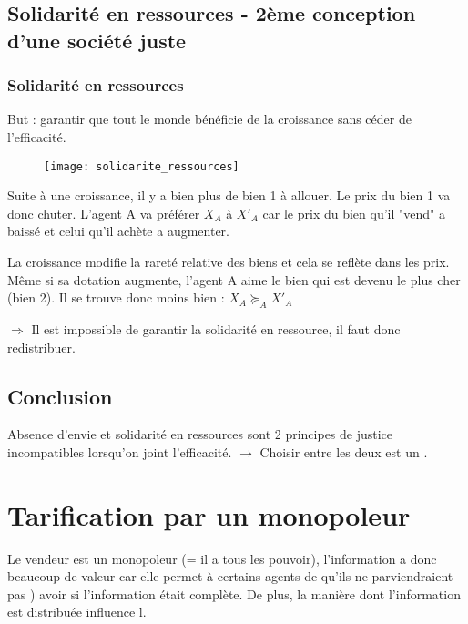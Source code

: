 \subsection{Solidarité en ressources - 2ème conception d'une société juste}

\subsubsection{Solidarité en ressources}

But : garantir que tout le monde bénéficie de la croissance sans céder de l'efficacité.

\begin{figure}[H]
	\centering
	\texttt{[image: solidarite\_ressources]}
\end{figure}

Suite à une croissance, il y a bien plus de bien 1 à allouer. Le prix du bien 1 va donc chuter. L'agent A va préférer $X_A$ à $X'_A$ car le prix du bien qu'il "vend" a baissé et celui qu'il achète a augmenter.

La croissance modifie la rareté relative des biens et cela se reflète dans les prix. Même si sa dotation augmente, l'agent A aime le bien qui est devenu le plus cher (bien 2). Il se trouve donc moins bien : $X_A \succeq_A X'_A$

$\Rightarrow$ Il est impossible de garantir la solidarité en ressource, il faut donc redistribuer.

\subsection{Conclusion}

Absence d'envie et solidarité en ressources sont 2 principes de justice incompatibles lorsqu'on joint l'efficacité. $\rightarrow$ Choisir entre les deux est un .

\section{Tarification par un monopoleur}

Le vendeur est un monopoleur (= il a tous les pouvoir), l'information a donc beaucoup de valeur car elle permet à certains agents de  qu'ils ne parviendraient pas ) avoir si l'information était complète. De plus, la manière dont l'information est distribuée influence l.

